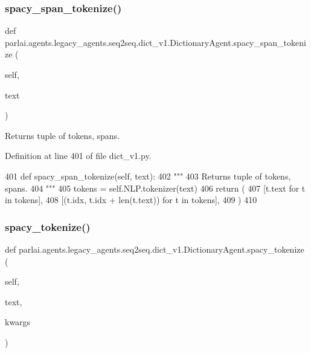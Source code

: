 \subsubsection{\texorpdfstring{spacy\+\_\+span\+\_\+tokenize()}{spacy\_span\_tokenize()}}
{\footnotesize\ttfamily def parlai.\+agents.\+legacy\+\_\+agents.\+seq2seq.\+dict\+\_\+v1.\+Dictionary\+Agent.\+spacy\+\_\+span\+\_\+tokenize (\begin{DoxyParamCaption}\item[{}]{self,  }\item[{}]{text }\end{DoxyParamCaption})}

\begin{DoxyVerb}Returns tuple of tokens, spans.
\end{DoxyVerb}
 

Definition at line 401 of file dict\+\_\+v1.\+py.


\begin{DoxyCode}
401     \textcolor{keyword}{def }spacy\_span\_tokenize(self, text):
402         \textcolor{stringliteral}{"""}
403 \textcolor{stringliteral}{        Returns tuple of tokens, spans.}
404 \textcolor{stringliteral}{        """}
405         tokens = self.NLP.tokenizer(text)
406         \textcolor{keywordflow}{return} (
407             [t.text \textcolor{keywordflow}{for} t \textcolor{keywordflow}{in} tokens],
408             [(t.idx, t.idx + len(t.text)) \textcolor{keywordflow}{for} t \textcolor{keywordflow}{in} tokens],
409         )
410 
\end{DoxyCode}
\mbox{\label{classparlai_1_1agents_1_1legacy__agents_1_1seq2seq_1_1dict__v1_1_1DictionaryAgent_a295893b8c3887c04200fcf2420ed33d2}} 
\subsubsection{\texorpdfstring{spacy\+\_\+tokenize()}{spacy\_tokenize()}}
{\footnotesize\ttfamily def parlai.\+agents.\+legacy\+\_\+agents.\+seq2seq.\+dict\+\_\+v1.\+Dictionary\+Agent.\+spacy\+\_\+tokenize (\begin{DoxyParamCaption}\item[{}]{self,  }\item[{}]{text,  }\item[{}]{kwargs }\end{DoxyParamCaption})}




